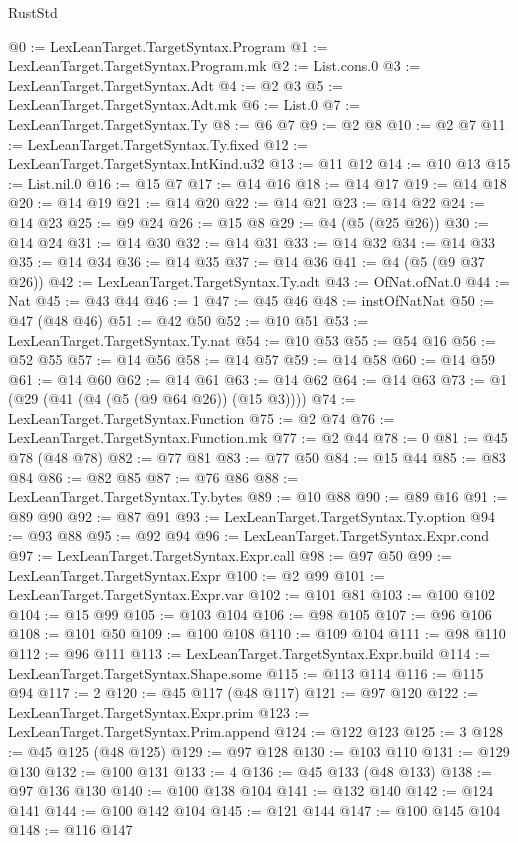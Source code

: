 \begin{lexlean}{RustStd}
\begin{coremodule}
@0 := LexLeanTarget.TargetSyntax.Program
@1 := LexLeanTarget.TargetSyntax.Program.mk
@2 := List.cons.{0}
@3 := LexLeanTarget.TargetSyntax.Adt
@4 := @2 @3
@5 := LexLeanTarget.TargetSyntax.Adt.mk
@6 := List.{0}
@7 := LexLeanTarget.TargetSyntax.Ty
@8 := @6 @7
@9 := @2 @8
@10 := @2 @7
@11 := LexLeanTarget.TargetSyntax.Ty.fixed
@12 := LexLeanTarget.TargetSyntax.IntKind.u32
@13 := @11 @12
@14 := @10 @13
@15 := List.nil.{0}
@16 := @15 @7
@17 := @14 @16
@18 := @14 @17
@19 := @14 @18
@20 := @14 @19
@21 := @14 @20
@22 := @14 @21
@23 := @14 @22
@24 := @14 @23
@25 := @9 @24
@26 := @15 @8
@29 := @4 (@5 (@25 @26))
@30 := @14 @24
@31 := @14 @30
@32 := @14 @31
@33 := @14 @32
@34 := @14 @33
@35 := @14 @34
@36 := @14 @35
@37 := @14 @36
@41 := @4 (@5 (@9 @37 @26))
@42 := LexLeanTarget.TargetSyntax.Ty.adt
@43 := OfNat.ofNat.{0}
@44 := Nat
@45 := @43 @44
@46 := 1
@47 := @45 @46
@48 := instOfNatNat
@50 := @47 (@48 @46)
@51 := @42 @50
@52 := @10 @51
@53 := LexLeanTarget.TargetSyntax.Ty.nat
@54 := @10 @53
@55 := @54 @16
@56 := @52 @55
@57 := @14 @56
@58 := @14 @57
@59 := @14 @58
@60 := @14 @59
@61 := @14 @60
@62 := @14 @61
@63 := @14 @62
@64 := @14 @63
@73 := @1 (@29 (@41 (@4 (@5 (@9 @64 @26)) (@15 @3))))
@74 := LexLeanTarget.TargetSyntax.Function
@75 := @2 @74
@76 := LexLeanTarget.TargetSyntax.Function.mk
@77 := @2 @44
@78 := 0
@81 := @45 @78 (@48 @78)
@82 := @77 @81
@83 := @77 @50
@84 := @15 @44
@85 := @83 @84
@86 := @82 @85
@87 := @76 @86
@88 := LexLeanTarget.TargetSyntax.Ty.bytes
@89 := @10 @88
@90 := @89 @16
@91 := @89 @90
@92 := @87 @91
@93 := LexLeanTarget.TargetSyntax.Ty.option
@94 := @93 @88
@95 := @92 @94
@96 := LexLeanTarget.TargetSyntax.Expr.cond
@97 := LexLeanTarget.TargetSyntax.Expr.call
@98 := @97 @50
@99 := LexLeanTarget.TargetSyntax.Expr
@100 := @2 @99
@101 := LexLeanTarget.TargetSyntax.Expr.var
@102 := @101 @81
@103 := @100 @102
@104 := @15 @99
@105 := @103 @104
@106 := @98 @105
@107 := @96 @106
@108 := @101 @50
@109 := @100 @108
@110 := @109 @104
@111 := @98 @110
@112 := @96 @111
@113 := LexLeanTarget.TargetSyntax.Expr.build
@114 := LexLeanTarget.TargetSyntax.Shape.some
@115 := @113 @114
@116 := @115 @94
@117 := 2
@120 := @45 @117 (@48 @117)
@121 := @97 @120
@122 := LexLeanTarget.TargetSyntax.Expr.prim
@123 := LexLeanTarget.TargetSyntax.Prim.append
@124 := @122 @123
@125 := 3
@128 := @45 @125 (@48 @125)
@129 := @97 @128
@130 := @103 @110
@131 := @129 @130
@132 := @100 @131
@133 := 4
@136 := @45 @133 (@48 @133)
@138 := @97 @136 @130
@140 := @100 @138 @104
@141 := @132 @140
@142 := @124 @141
@144 := @100 @142 @104
@145 := @121 @144
@147 := @100 @145 @104
@148 := @116 @147

\end{coremodule}
\end{lexlean}
